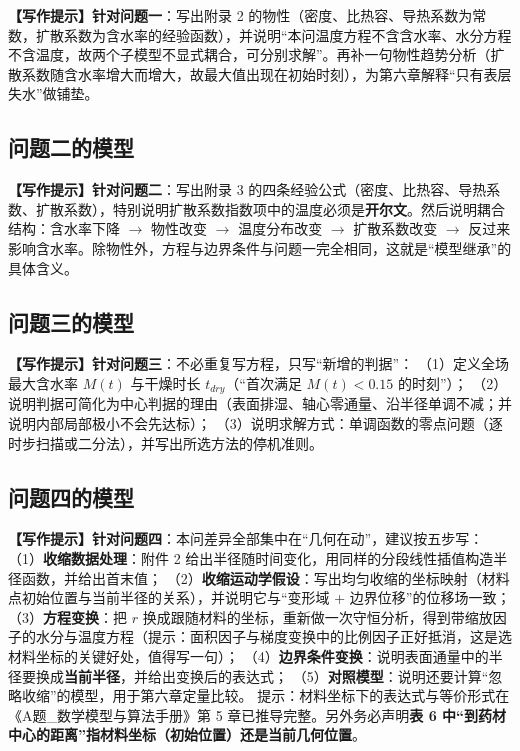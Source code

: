 \documentclass[12pt,a4paper]{article}
\newcommand{\prompt}[1]{\par\noindent\textbf{【写作提示】}#1\par}      %
\begin{document}
\prompt{\textbf{针对问题一}：写出附录 2 的物性（密度、比热容、导热系数为常数，扩散系数为含水率的经验函数），并说明“本问温度方程不含含水率、水分方程不含温度，故两个子模型不显式耦合，可分别求解”。再补一句物性趋势分析（扩散系数随含水率增大而增大，故最大值出现在初始时刻），为第六章解释“只有表层失水”做铺垫。}

\subsection{问题二的模型}

\prompt{\textbf{针对问题二}：写出附录 3 的四条经验公式（密度、比热容、导热系数、扩散系数），特别说明扩散系数指数项中的温度必须是\textbf{开尔文}。然后说明耦合结构：含水率下降 $\rightarrow$ 物性改变 $\rightarrow$ 温度分布改变 $\rightarrow$ 扩散系数改变 $\rightarrow$ 反过来影响含水率。除物性外，方程与边界条件与问题一完全相同，这就是“模型继承”的具体含义。}

\subsection{问题三的模型}

\prompt{\textbf{针对问题三}：不必重复写方程，只写“新增的判据”：
（1）定义全场最大含水率 $M(t)$ 与干燥时长 $t_{dry}$（“首次满足 $M(t)<0.15$ 的时刻”）；
（2）说明判据可简化为中心判据的理由（表面排湿、轴心零通量、沿半径单调不减；并说明内部局部极小不会先达标）；
（3）说明求解方式：单调函数的零点问题（逐时步扫描或二分法），并写出所选方法的停机准则。}

\subsection{问题四的模型}

\prompt{\textbf{针对问题四}：本问差异全部集中在“几何在动”，建议按五步写：
（1）\textbf{收缩数据处理}：附件 2 给出半径随时间变化，用同样的分段线性插值构造半径函数，并给出首末值；
（2）\textbf{收缩运动学假设}：写出均匀收缩的坐标映射（材料点初始位置与当前半径的关系），并说明它与“变形域 + 边界位移”的位移场一致；
（3）\textbf{方程变换}：把 $r$ 换成跟随材料的坐标，重新做一次守恒分析，得到带缩放因子的水分与温度方程（提示：面积因子与梯度变换中的比例因子正好抵消，这是选材料坐标的关键好处，值得写一句）；
（4）\textbf{边界条件变换}：说明表面通量中的半径要换成\textbf{当前半径}，并给出变换后的表达式；
（5）\textbf{对照模型}：说明还要计算“忽略收缩”的模型，用于第六章定量比较。
提示：材料坐标下的表达式与等价形式在《A题\_数学模型与算法手册》第 5 章已推导完整。另外务必声明\textbf{表 6 中“到药材中心的距离”指材料坐标（初始位置）还是当前几何位置}。}
\end{document}
